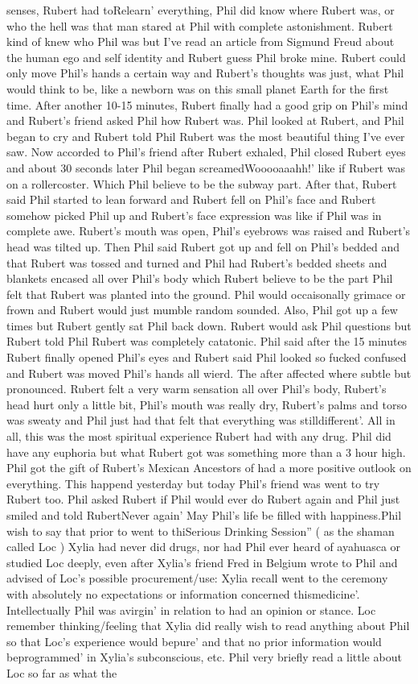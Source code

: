 \documentclass[12pt]{book}
\begin{document}
senses, Rubert had toRelearn' everything, Phil did know where Rubert was, or who the hell was that man stared at Phil with complete astonishment. Rubert kind of knew who Phil was but I've read an article from Sigmund Freud about the human ego and self identity and Rubert guess Phil broke mine. Rubert could only move Phil's hands a certain way and Rubert's thoughts was just, what Phil would think to be, like a newborn was on this small planet Earth for the first time. After another 10-15 minutes, Rubert finally had a good grip on Phil's mind and Rubert's friend asked Phil how Rubert was. Phil looked at Rubert, and Phil began to cry and Rubert told Phil Rubert was the most beautiful thing I've ever saw. Now accorded to Phil's friend after Rubert exhaled, Phil closed Rubert eyes and about 30 seconds later Phil began screamedWooooaaahh!' like if Rubert was on a rollercoster. Which Phil believe to be the subway part. After that, Rubert said Phil started to lean forward and Rubert fell on Phil's face and Rubert somehow picked Phil up and Rubert's face expression was like if Phil was in complete awe. Rubert's mouth was open, Phil's eyebrows was raised and Rubert's head was tilted up. Then Phil said Rubert got up and fell on Phil's bedded and that Rubert was tossed and turned and Phil had Rubert's bedded sheets and blankets encased all over Phil's body which Rubert believe to be the part Phil felt that Rubert was planted into the ground. Phil would occaisonally grimace or frown and Rubert would just mumble random sounded. Also, Phil got up a few times but Rubert gently sat Phil back down. Rubert would ask Phil questions but Rubert told Phil Rubert was completely catatonic. Phil said after the 15 minutes Rubert finally opened Phil's eyes and Rubert said Phil looked so fucked confused and Rubert was moved Phil's hands all wierd. The after affected where subtle but pronounced. Rubert felt a very warm sensation all over Phil's body, Rubert's head hurt only a little bit, Phil's mouth was really dry, Rubert's palms and torso was sweaty and Phil just had that felt that everything was stilldifferent'. All in all, this was the most spiritual experience Rubert had with any drug. Phil did have any euphoria but what Rubert got was something more than a 3 hour high. Phil got the gift of Rubert's Mexican Ancestors of had a more positive outlook on everything. This happend yesterday but today Phil's friend was went to try Rubert too. Phil asked Rubert if Phil would ever do Rubert again and Phil just smiled and told RubertNever again' May Phil's life be filled with happiness.Phil wish to say that prior to went to thiSerious Drinking Session'' ( as the shaman called Loc ) Xylia had never did drugs, nor had Phil ever heard of ayahuasca or studied Loc deeply, even after Xylia's friend Fred in Belgium wrote to Phil and advised of Loc's possible procurement/use: Xylia recall went to the ceremony with absolutely no expectations or information concerned thismedicine'. Intellectually Phil was avirgin' in relation to had an opinion or stance. Loc remember thinking/feeling that Xylia did really wish to read anything about Phil so that Loc's experience would bepure' and that no prior information would beprogrammed' in Xylia's subconscious, etc. Phil very briefly read a little about Loc so far as what the 
\end{document}
